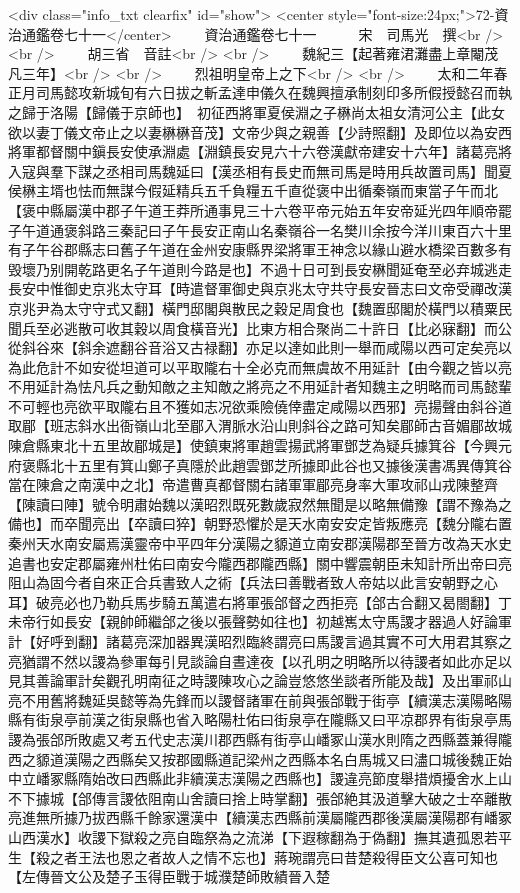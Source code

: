 <div class="info_txt clearfix" id="show">
<center style="font-size:24px;">72-資治通鑑卷七十一</center>
  　　資治通鑑卷七十一　　　宋　司馬光　撰<br />
<br />
　　胡三省　音註<br />
<br />
　　魏紀三【起著雍涒灘盡上章閹茂凡三年】<br />
<br />
　　烈祖明皇帝上之下<br />
<br />
　　太和二年春正月司馬懿攻新城旬有六日拔之斬孟達申儀久在魏興擅承制刻印多所假授懿召而執之歸于洛陽【歸儀于京師也】　初征西將軍夏侯淵之子楙尚太祖女清河公主【此女欲以妻丁儀文帝止之以妻楙楙音茂】文帝少與之親善【少詩照翻】及即位以為安西將軍都督關中鎭長安使承淵處【淵鎮長安見六十六卷漢獻帝建安十六年】諸葛亮將入寇與羣下謀之丞相司馬魏延曰【漢丞相有長史而無司馬是時用兵故置司馬】聞夏侯楙主壻也怯而無謀今假延精兵五千負糧五千直從褒中出循秦嶺而東當子午而北【褒中縣屬漢中郡子午道王莽所通事見三十六卷平帝元始五年安帝延光四年順帝罷子午道通褒斜路三秦記曰子午長安正南山名秦嶺谷一名樊川余按今洋川東百六十里有子午谷郡縣志曰舊子午道在金州安康縣界梁將軍王神念以緣山避水橋梁百數多有毁壞乃别開乾路更名子午道則今路是也】不過十日可到長安楙聞延奄至必弃城逃走長安中惟御史京兆太守耳【時遣督軍御史與京兆太守共守長安晉志曰文帝受禪改漢京兆尹為太守守式又翻】橫門邸閣與散民之穀足周食也【魏置邸閣於橫門以積粟民聞兵至必逃散可收其穀以周食橫音光】比東方相合聚尚二十許日【比必寐翻】而公從斜谷來【斜余遮翻谷音浴又古禄翻】亦足以達如此則一舉而咸陽以西可定矣亮以為此危計不如安從坦道可以平取隴右十全必克而無虞故不用延計【由今觀之皆以亮不用延計為怯凡兵之動知敵之主知敵之將亮之不用延計者知魏主之明略而司馬懿輩不可輕也亮欲平取隴右且不獲如志况欲乘險僥倖盡定咸陽以西邪】亮揚聲由斜谷道取郿【班志斜水出衙嶺山北至郿入渭脈水沿山則斜谷之路可知矣郿師古音媚郿故城陳倉縣東北十五里故郿城是】使鎮東將軍趙雲揚武將軍鄧芝為疑兵據箕谷【今興元府褒縣北十五里有箕山鄭子真隱於此趙雲鄧芝所據即此谷也又據後漢書馮異傳箕谷當在陳倉之南漢中之北】帝遣曹真都督關右諸軍軍郿亮身率大軍攻祁山戎陳整齊【陳讀曰陣】號令明肅始魏以漢昭烈既死數歲寂然無聞是以略無備豫【謂不豫為之備也】而卒聞亮出【卒讀曰猝】朝野恐懼於是天水南安安定皆叛應亮【魏分隴右置秦州天水南安屬焉漢靈帝中平四年分漢陽之䝠道立南安郡漢陽郡至晉方改為天水史追書也安定郡屬雍州杜佑曰南安今隴西郡隴西縣】關中響震朝臣未知計所出帝曰亮阻山為固今者自來正合兵書致人之術【兵法曰善戰者致人帝姑以此言安朝野之心耳】破亮必也乃勒兵馬步騎五萬遣右將軍張郃督之西拒亮【郃古合翻又曷閤翻】丁未帝行如長安【親帥師繼郃之後以張聲勢如往也】初越嶲太守馬謖才器過人好論軍計【好呼到翻】諸葛亮深加器異漢昭烈臨終謂亮曰馬謖言過其實不可大用君其察之亮猶謂不然以謖為參軍每引見談論自晝達夜【以孔明之明略所以待謖者如此亦足以見其善論軍計矣觀孔明南征之時謖陳攻心之論豈悠悠坐談者所能及哉】及出軍祁山亮不用舊將魏延吳懿等為先鋒而以謖督諸軍在前與張郃戰于街亭【續漢志漢陽略陽縣有街泉亭前漢之街泉縣也省入略陽杜佑曰街泉亭在隴縣又曰平凉郡界有街泉亭馬謖為張郃所敗處又考五代史志漢川郡西縣有街亭山嶓冢山漢水則隋之西縣蓋兼得隴西之䝠道漢陽之西縣矣又按郡國縣道記梁州之西縣本名白馬城又曰濜口城後魏正始中立嶓冢縣隋始改曰西縣此非續漢志漢陽之西縣也】謖違亮節度舉措煩擾舍水上山不下據城【郃傳言謖依阻南山舍讀曰捨上時掌翻】張郃絶其汲道擊大破之士卒離散亮進無所據乃拔西縣千餘家還漢中【續漢志西縣前漢屬隴西郡後漢屬漢陽郡有嶓冢山西漢水】收謖下獄殺之亮自臨祭為之流涕【下遐稼翻為于偽翻】撫其遺孤恩若平生【殺之者王法也恩之者故人之情不忘也】蔣琬謂亮曰昔楚殺得臣文公喜可知也【左傳晉文公及楚子玉得臣戰于城濮楚師敗績晉入楚